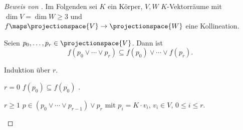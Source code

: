\begin{proof}[Beweis von ]
  Im Folgenden sei \( K \) ein Körper, \( V,W \) \( K \)-Vektorräume mit \( \dim{V}=\dim{W}\geq 3 \) und \( f\maps \projectionspace{V}\to \projectionspace{W} \) eine Kollineation.
  \begin{lemma}\label{kollineation_erhaelt_verbindungsraum}
    Seien \( p_0,\dotsc,p_r\in \projectionspace{V} \). Dann ist
    \begin{equation*}
      f(p_0 \vee \dotsb\vee p_r)\subseteq f(p_0)\vee \dotsb\vee f(p_r).
    \end{equation*}
  \end{lemma}
  \begin{subproof}
    Induktion über \( r \).
    \begin{proofdescription}
      \item[\( r=0 \)] \( f(p_0)\subseteq f(p_0) \) \checkmark.
      \item[\( r\geq 1 \)] \( p\in (p_0\vee \dotsb\vee p_{r-1})\vee p_r \) mit \( p_i=K\cdot v_i \), \( v_i\in V \), \( 0\leq i\leq r \). 


\end{proofdescription}
\end{subproof}
\end{proof}
